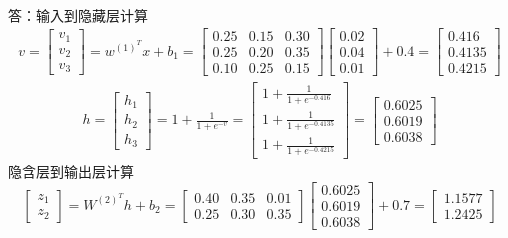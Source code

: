 \documentclass{homework}
\begin{document}
\normalsize
\\
答：输入到隐藏层计算
\begin{align*}
	v = 
	\begin{bmatrix}
		v_1\\
		v_2\\
		v_3
	\end{bmatrix}
	= w^{(1)^T}x+b_1
	=
	\begin{bmatrix}
		0.25& 0.15& 0.30\\
		0.25& 0.20& 0.35\\
		0.10& 0.25& 0.15
	\end{bmatrix}
	\begin{bmatrix}
		0.02\\
		0.04\\
		0.01
	\end{bmatrix}
	+0.4
	=
	\begin{bmatrix}
		0.416\\
		0.4135\\
		0.4215
	\end{bmatrix}
\end{align*}
\begin{align*}
	h = 
	\begin{bmatrix}
		h_1\\
		h_2\\
		h_3
	\end{bmatrix}
	= 1+ \frac{1}{1 + e^{-v}}
	= 
	\begin{bmatrix}
		1+ \frac{1}{1 + e^{-0.416}}\\
		1+ \frac{1}{1 + e^{-0.4135}}\\
		1+ \frac{1}{1 + e^{-0.4215}}
	\end{bmatrix}
	= 
	\begin{bmatrix}
		0.6025\\
		0.6019\\
		0.6038
	\end{bmatrix}
\end{align*}
隐含层到输出层计算
$$
\begin{bmatrix}
	z_1\\z_2
\end{bmatrix}
=W^{(2)^T}h + b_2 = 
\begin{bmatrix}
	0.40& 0.35& 0.01\\
	0.25& 0.30& 0.35
\end{bmatrix}
\begin{bmatrix}
	0.6025\\ 0.6019\\ 0.6038
\end{bmatrix}
+0.7 = 
\begin{bmatrix}
	1.1577\\ 1.2425
\end{bmatrix}
$$
\end{document}
